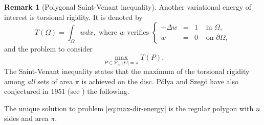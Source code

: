 \documentclass[JEP,XML,SOM,Unicode,ThmDefs,NoFloatCountersInSection,published]{cedram}
\theoremstyle{plain}
\theoremstyle{definition}
\newtheorem{rem}[thm]{Remark}
\newcommand{\Pol}[1]{\mathcal P_{#1}}
\begin{document}
\begin{rem}[Polygonal Saint-Venant inequality]
\label{bobu40}
Another variational energy of interest is torsional rigidity. It is denoted by
\begin{equation}
T(\Omega) = \int_\Omega wdx, \text{ where } w \text{ verifies } \left\{\begin{array}{rcll}
-\Delta w & = & 1 & \text{ in }\Omega, \\
w & = & 0 &\text{ on } \partial \Omega,
\end{array}\right.
\label{eq:dirichlet-energy}
\end{equation}
and the problem to consider
\begin{equation}
\max_{P \in \Pol n, |\Omega| = \pi} T(P).
\label{eq:max-dir-energy}
\end{equation}
The Saint-Venant inequality states that the maximum of the torsional rigidity among {\it all} sets of area $\pi$ is achieved on the disc.
Pólya and Szegö have also conjectured in 1951 (see \cite[p.\,158]{PoSz51}) the following.

\begin{conj*}
The unique solution to problem \eqref{eq:max-dir-energy} is the regular polygon with $n$ sides and area $\pi$.
\end{conj*}


\end{rem}
\end{document}
